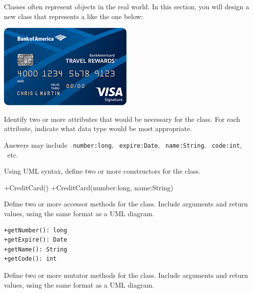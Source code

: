 
Classes often represent objects in the real world.
In this section, you will design a new class that represents a  like the one below:

\begin{center}
\includegraphics{credit-card.png}
\end{center}




\Q Identify two or more attributes that would be necessary for the  class.
For each attribute, indicate what data type would be most appropriate.

\begin{answer}
Answers may include ~\verb|number:long|, ~\verb|expire:Date|, ~\verb|name:String|, ~\verb|code:int|, ~etc.
\end{answer}


\Q Using UML syntax, define two or more constructors for the  class.

\begin{answer}
\begin{javaans}
+CreditCard()
+CreditCard(number:long, name:String)
\end{javaans}
\end{answer}


\Q Define two or more accessor methods for the  class.
Include arguments and return values, using the same format as a UML diagram.

\begin{answer}[5em]
\begin{verbatim}
+getNumber(): long
+getExpire(): Date
+getName(): String
+getCode(): int
\end{verbatim}
\end{answer}


\Q Define two or more mutator methods for the  class.
Include arguments and return values, using the same format as a UML diagram.

